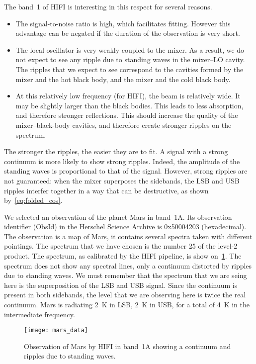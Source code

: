 The band~1 of HIFI is interesting in this respect for several reasons.
\begin{itemize}
    \item
        The signal-to-noise ratio is high, which facilitates fitting.
        However this advantage can be negated if the duration of the observation is very short.
    \item
        The local oscillator is very weakly coupled to the mixer.
        As a result, we do not expect to see any ripple due to standing waves in the mixer--LO cavity.
        The ripples that we expect to see correspond to the cavities formed by the mixer and the hot black body, and the mixer and the cold black body.
    \item
        At this relatively low frequency (for HIFI), the beam is relatively wide.
        It may be slightly larger than the black bodies.
        This leads to less absorption, and therefore stronger reflections.
        This should increase the quality of the mixer--black-body cavities,
        and therefore create stronger ripples on the spectrum.
\end{itemize}

The stronger the ripples, the easier they are to fit.
A signal with a strong continuum is more likely to show strong ripples.
Indeed, the amplitude of the standing waves is proportional to that of the signal.
However, strong ripples are not guaranteed: when the mixer superposes the sidebands,
the LSB and USB ripples interfer together in a way that can be destructive,
as shown by~\cref{eq:folded_cos}.

We selected an observation of the planet Mars in band~1A.
Its observation identifier (ObsId) in the Herschel Science Archive is 0x50004203 (hexadecimal).
The observation is a map of Mars, it contains several spectra taken with different pointings.
The spectrum that we have chosen is the number 25 of the level-2 product.
The spectrum, as calibrated by the HIFI pipeline, is show on~\cref{fig:mars_data}.
The spectrum does not show any spectral lines, only a continuum distorted by ripples due to standing waves.
We must remember that the spectrum that we are seing here is the superposition of the LSB and USB signal.
Since the continuum is present in both sidebands, the level that we are observing here is twice the real continuum.
Mars is radiating \SI{2}{\kelvin} in LSB, \SI{2}{\kelvin} in USB, for a total of \SI{4}{\kelvin} in the intermediate frequency.
\begin{figure}
    \centering
    \texttt{[image: mars\_data]}
    \caption{Observation of Mars by HIFI in band~1A showing a continuum and ripples due to standing waves.}
    \label{fig:mars_data}
\end{figure}

